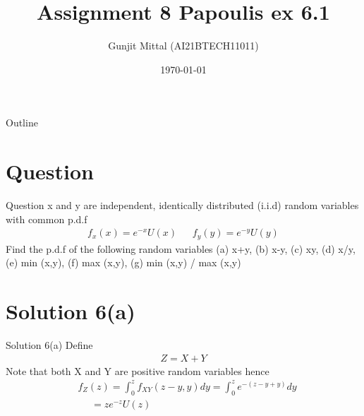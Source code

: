 \documentclass{beamer}
\title{Assignment 8 Papoulis ex 6.1}
\author{Gunjit Mittal (AI21BTECH11011)}
\date{\today}
\providecommand{\brak}[1]{\ensuremath{\left(#1\right)}}
\theoremstyle{remark}
\numberwithin{equation}{section}
\numberwithin{figure}{section}
\numberwithin{table}{section}
\begin{document}
 
\begin{frame}
  \titlepage{}
\end{frame}
\logo{}
\begin{frame}{Outline}
  \tableofcontents
\end{frame}
\section{Question}
\begin{frame}{Question}
x and y are independent, identically distributed (i.i.d) random variables with common p.d.f
\begin{align*}
    f_x\brak{x} = e^{-x}U\brak{x}~~~~~~~f_y\brak{y} = e^{-y}U\brak{y}
\end{align*}
Find the p.d.f of the following random variables (a) x+y, (b) x-y, (c) xy, (d) x/y, (e) min (x,y), (f) max (x,y), (g) min (x,y) / max (x,y)
\end{frame}
\section{Solution 6(a)} 
\begin{frame}{Solution 6(a)}
Define 
\begin{align}
  Z = X + Y
\end{align}
Note that both X and Y are positive random variables hence 
\begin{align}
  &f_Z\brak{z} = \int_{0}^{z} f_{XY}\brak{z-y,y}dy = \int_0^z e^{-\brak{z-y+y}}dy\\
 &~~~~~~= ze^{-z}U\brak{z}
\end{align}
\end{frame}
\end{document}
